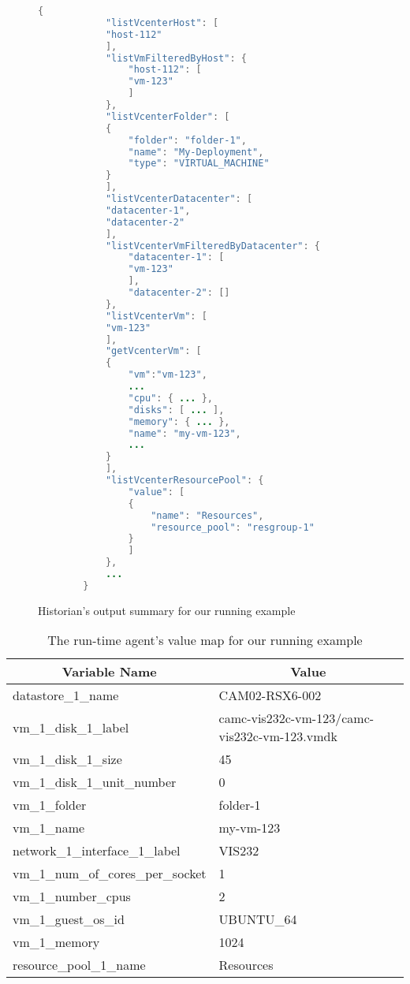 \begin{figure}[p]
	\centering
	\begin{lstlisting}[style=json,language=java]
		{
			"listVcenterHost": [
			"host-112"
			],
			"listVmFilteredByHost": {
				"host-112": [
				"vm-123"
				]
			},
			"listVcenterFolder": [
			{
				"folder": "folder-1",
				"name": "My-Deployment",
				"type": "VIRTUAL_MACHINE"
			}
			],
			"listVcenterDatacenter": [
			"datacenter-1",
			"datacenter-2"
			],
			"listVcenterVmFilteredByDatacenter": {
				"datacenter-1": [
				"vm-123"
				],
				"datacenter-2": []
			},
			"listVcenterVm": [
			"vm-123"
			],
			"getVcenterVm": [
			{
				"vm":"vm-123",
				...
				"cpu": { ... },
				"disks": [ ... ],
				"memory": { ... },
				"name": "my-vm-123",
				...
			}
			],
			"listVcenterResourcePool": {
				"value": [
				{
					"name": "Resources",
					"resource_pool": "resgroup-1"
				}
				]
			},
			...
		}
	\end{lstlisting}
	\caption{Historian's output summary for our running example}
	\label{lst:delivery-platform--json-sample-view}
\end{figure}

\begin{table}[p]
	\centering
	\caption{The run-time agent's value map for our running example}
	\label{tab:delivery-platform--value-map-running-example}
	\begin{tabular}{l | l}
		\toprule
		\multicolumn{1}{c}{\textbf{Variable Name}} & \multicolumn{1}{c}{\textbf{Value}} \\
		\midrule
		datastore\_1\_name & CAM02-RSX6-002 \\
		vm\_1\_disk\_1\_label & camc-vis232c-vm-123/camc-vis232c-vm-123.vmdk \\
		vm\_1\_disk\_1\_size & 45 \\
		vm\_1\_disk\_1\_unit\_number & 0 \\
		vm\_1\_folder & folder-1 \\
		vm\_1\_name & my-vm-123 \\
		network\_1\_interface\_1\_label & VIS232 \\
		vm\_1\_num\_of\_cores\_per\_socket & 1 \\
		vm\_1\_number\_cpus & 2 \\
		vm\_1\_guest\_os\_id & UBUNTU\_64 \\
		vm\_1\_memory & 1024 \\
		resource\_pool\_1\_name & Resources \\
		\bottomrule
	\end{tabular}
\end{table}


